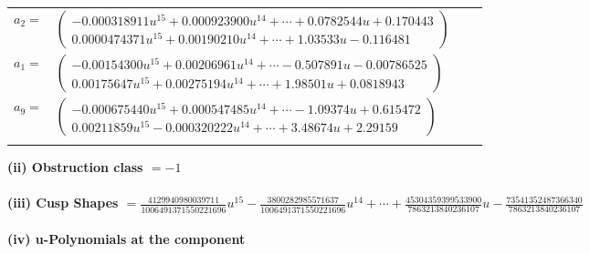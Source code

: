 \documentclass[1p]{elsarticle_modified}
\theoremstyle{definition}
\begin{document}
\begin{tabular}{m{7pt} m{180pt} m{7pt} m{180pt} }
\flushright $a_{2}=$&$\begin{pmatrix}-0.000318911 u^{15}+0.000923900 u^{14}+\cdots+0.0782544 u+0.170443\\0.0000474371 u^{15}+0.00190210 u^{14}+\cdots+1.03533 u-0.116481\end{pmatrix}$ \\
\flushright $a_{1}=$&$\begin{pmatrix}-0.00154300 u^{15}+0.00206961 u^{14}+\cdots-0.507891 u-0.00786525\\0.00175647 u^{15}+0.00275194 u^{14}+\cdots+1.98501 u+0.0818943\end{pmatrix}$ \\
\flushright $a_{9}=$&$\begin{pmatrix}-0.000675440 u^{15}+0.000547485 u^{14}+\cdots-1.09374 u+0.615472\\0.00211859 u^{15}-0.000320222 u^{14}+\cdots+3.48674 u+2.29159\end{pmatrix}$\\&\end{tabular}
\flushleft \textbf{(ii) Obstruction class $= -1$}\\~\\
\flushleft \textbf{(iii) Cusp Shapes $= \frac{4129940980039711}{1006491371550221696} u^{15}-\frac{3800282985571637}{1006491371550221696} u^{14}+\cdots+\frac{45304359399533900}{7863213840236107} u-\frac{73541352487366340}{7863213840236107}$}\\~\\
\newpage\renewcommand{\arraystretch}{1}
\flushleft \textbf{(iv) u-Polynomials at the component}\newline \\
\end{document}
